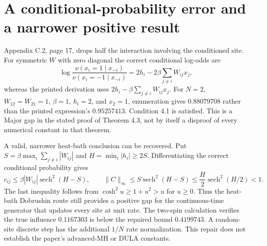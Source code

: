 \documentclass[10pt]{article}
\begin{document}
\section*{A conditional-probability error and a narrower positive result}
Appendix C.2, page 17, drops half the interaction involving the conditioned site. For symmetric \(W\) with zero diagonal the correct conditional log-odds are \[\log\frac{\nu(x_i=1\mid x_{\sim i})}{\nu(x_i=-1\mid x_{\sim i})}
 =2h_i-2\beta\sum_{j\ne i}W_{ij}x_j,\] whereas the printed derivation uses \(2h_i-\beta\sum_{j\ne i}W_{ij}x_j\). For \(N=2\), \(W_{12}=W_{21}=1\), \(\beta=1\), \(h_i=2\), and \(x_2=1\), enumeration gives \(0.88079708\) rather than the printed expression’s \(0.95257413\). Condition 4.1 is satisfied. This is a Major gap in the stated proof of Theorem 4.3, not by itself a disproof of every numerical constant in that theorem.\par
A valid, narrower heat-bath conclusion can be recovered. Put \(S=\beta\max_i\sum_{j\ne i}|W_{ij}|\) and \(H=\min_i|h_i|\geq2S\). Differentiating the correct conditional probability gives \[c_{ij}\leq\beta|W_{ij}|\operatorname{sech}^2(H-S),\qquad
 \|C\|_\infty\leq S\operatorname{sech}^2(H-S)
 \leq\frac H2\operatorname{sech}^2(H/2)<1.\] The last inequality follows from \(\cosh^2u\geq1+u^2>u\) for \(u\geq0\). Thus the heat-bath Dobrushin route still provides a positive gap for the continuous-time generator that updates every site at unit rate. The two-spin calculation verifies the true influence \(0.1167303\) is below the repaired bound \(0.4199743\). A random-site discrete step has the additional \(1/N\) rate normalization. This repair does not establish the paper’s advanced-MH or DULA constants.\par
\end{document}
